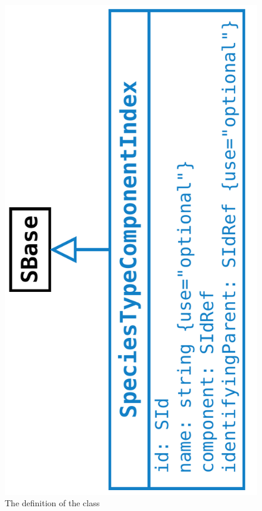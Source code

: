\begin{figure}[htb]
  \begin{center}
    \includegraphics[angle=-90, scale=0.35]{./figs/multi_013_SpeciesTypeComponentIndex.pdf}
    \caption{The definition of the \SpeciesTypeComponentIndex class}
  \label{fig:SpeciesTypeComponentIndex}
  \end{center}
\end{figure}

